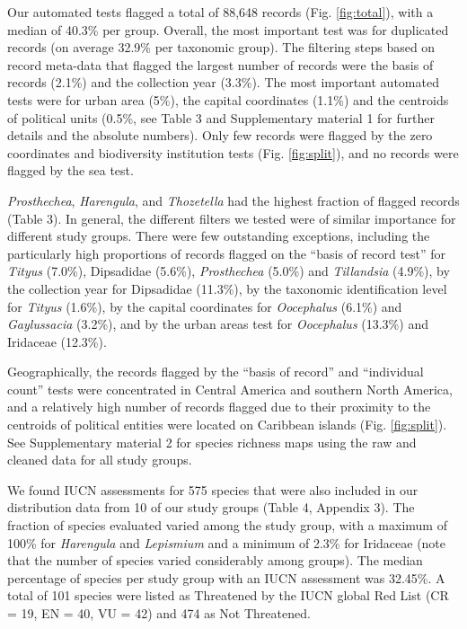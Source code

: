 \documentclass[
  12pt,
]{article}
\begin{document}
Our automated tests flagged a total of 88,648 records (Fig. \ref{fig:total}), with a median of 40.3\% per group. Overall, the most important test was for duplicated records (on average 32.9\% per taxonomic group). The filtering steps based on record meta-data that flagged the largest number of records were the basis of records (2.1\%) and the collection year (3.3\%). The most important automated tests were for urban area (5\%), the capital coordinates (1.1\%) and the centroids of political units (0.5\%, see Table 3 and Supplementary material 1 for further details and the absolute numbers). Only few records were flagged by the zero coordinates and biodiversity institution tests (Fig. \ref{fig:split}), and no records were flagged by the sea test.

\emph{Prosthechea}, \emph{Harengula}, and \emph{Thozetella} had the highest fraction of flagged records (Table 3). In general, the different filters we tested were of similar importance for different study groups. There were few outstanding exceptions, including the particularly high proportions of records flagged on the ``basis of record test'' for \emph{Tityus} (7.0\%), Dipsadidae (5.6\%), \emph{Prosthechea} (5.0\%) and \emph{Tillandsia} (4.9\%), by the collection year for Dipsadidae (11.3\%), by the taxonomic identification level for \emph{Tityus} (1.6\%), by the capital coordinates for \emph{Oocephalus} (6.1\%) and \emph{Gaylussacia} (3.2\%), and by the urban areas test for \emph{Oocephalus} (13.3\%) and Iridaceae (12.3\%).

Geographically, the records flagged by the ``basis of record'' and ``individual count'' tests were concentrated in Central America and southern North America, and a relatively high number of records flagged due to their proximity to the centroids of political entities were located on Caribbean islands (Fig. \ref{fig:split}). See Supplementary material 2 for species richness maps using the raw and cleaned data for all study groups.

We found IUCN assessments for 575 species that were also included in our distribution data from 10 of our study groups (Table 4, Appendix 3). The fraction of species evaluated varied among the study group, with a maximum of 100\% for \emph{Harengula} and \emph{Lepismium} and a minimum of 2.3\% for Iridaceae (note that the number of species varied considerably among groups). The median percentage of species per study group with an IUCN assessment was 32.45\%. A total of 101 species were listed as Threatened by the IUCN global Red List (CR = 19, EN = 40, VU = 42) and 474 as Not Threatened.
\end{document}
